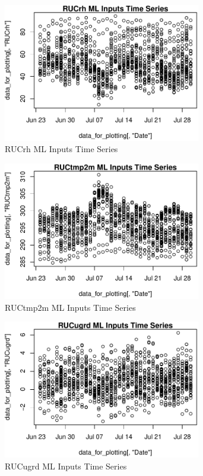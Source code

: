 \begin{figure} 
\centering  
\includegraphics[width=0.77\textwidth]{Code_Outputs/ML_input_report_AllforCaret_cleaned_StepPractice_part_practice_RUCrhTS.pdf} 
\caption{\label{fig:ML_input_report_AllforCaret_cleaned_StepPractice_part_practiceRUCrhTS}RUCrh ML Inputs Time Series} 
\end{figure} 
 

\begin{figure} 
\centering  
\includegraphics[width=0.77\textwidth]{Code_Outputs/ML_input_report_AllforCaret_cleaned_StepPractice_part_practice_RUCtmp2mTS.pdf} 
\caption{\label{fig:ML_input_report_AllforCaret_cleaned_StepPractice_part_practiceRUCtmp2mTS}RUCtmp2m ML Inputs Time Series} 
\end{figure} 
 

\begin{figure} 
\centering  
\includegraphics[width=0.77\textwidth]{Code_Outputs/ML_input_report_AllforCaret_cleaned_StepPractice_part_practice_RUCugrdTS.pdf} 
\caption{\label{fig:ML_input_report_AllforCaret_cleaned_StepPractice_part_practiceRUCugrdTS}RUCugrd ML Inputs Time Series} 
\end{figure} 
 

